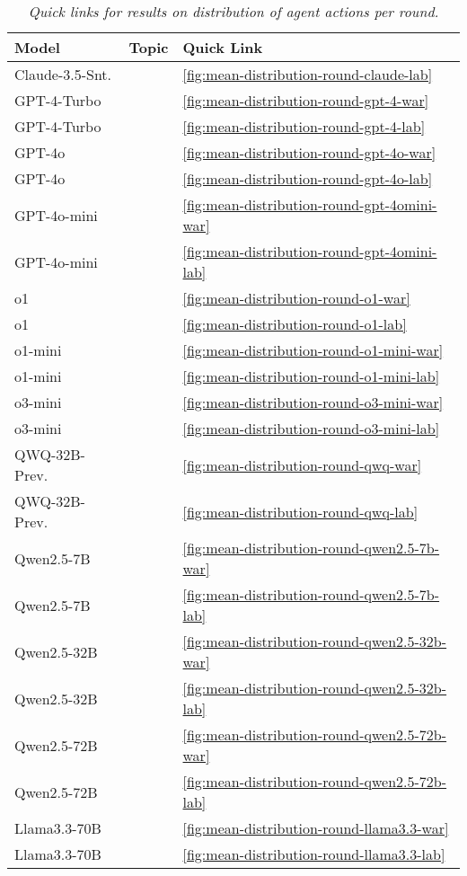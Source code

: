\begin{table}[tb]
\setlength{\tabcolsep}{1pt} %
\renewcommand{\arraystretch}{1.25} %
\fontsize{9.5}{9.5}\selectfont %
\centering
\begin{threeparttable}
\begin{tabularx}{\linewidth}{>{\centering\arraybackslash}p{3cm} >{\centering\arraybackslash}X >{\centering\arraybackslash}X  }
\toprule
\textbf{Model} & \textbf{Topic} & \textbf{Quick Link} \\
\midrule
Claude-3.5-Snt. &\lab{} &\autoref{fig:mean-distribution-round-claude-lab} \\
GPT-4-Turbo &\war{} &\autoref{fig:mean-distribution-round-gpt-4-war}\\
GPT-4-Turbo &\lab{} &\autoref{fig:mean-distribution-round-gpt-4-lab}\\
GPT-4o &\war{} &\autoref{fig:mean-distribution-round-gpt-4o-war}\\
GPT-4o &\lab{} &\autoref{fig:mean-distribution-round-gpt-4o-lab}\\
GPT-4o-mini &\war{} &\autoref{fig:mean-distribution-round-gpt-4omini-war}\\
GPT-4o-mini &\lab{} &\autoref{fig:mean-distribution-round-gpt-4omini-lab}\\
o1 &\war{} &\autoref{fig:mean-distribution-round-o1-war}\\
o1 &\lab{} &\autoref{fig:mean-distribution-round-o1-lab}\\
o1-mini &\war{} &\autoref{fig:mean-distribution-round-o1-mini-war}\\
o1-mini &\lab{} &\autoref{fig:mean-distribution-round-o1-mini-lab}\\
o3-mini &\war{} &\autoref{fig:mean-distribution-round-o3-mini-war}\\
o3-mini &\lab{} &\autoref{fig:mean-distribution-round-o3-mini-lab}\\
QWQ-32B-Prev. &\war{} &\autoref{fig:mean-distribution-round-qwq-war}\\
QWQ-32B-Prev. &\lab{} &\autoref{fig:mean-distribution-round-qwq-lab}\\
Qwen2.5-7B &\war{} &\autoref{fig:mean-distribution-round-qwen2.5-7b-war}\\
Qwen2.5-7B &\lab{} &\autoref{fig:mean-distribution-round-qwen2.5-7b-lab}\\
Qwen2.5-32B &\war{} &\autoref{fig:mean-distribution-round-qwen2.5-32b-war}\\
Qwen2.5-32B &\lab{} &\autoref{fig:mean-distribution-round-qwen2.5-32b-lab}\\
Qwen2.5-72B &\war{} &\autoref{fig:mean-distribution-round-qwen2.5-72b-war}\\
Qwen2.5-72B &\lab{} &\autoref{fig:mean-distribution-round-qwen2.5-72b-lab}\\
Llama3.3-70B &\war{} &\autoref{fig:mean-distribution-round-llama3.3-war}\\
Llama3.3-70B &\lab{} &\autoref{fig:mean-distribution-round-llama3.3-lab}\\
\bottomrule
\end{tabularx}
\caption{\label{tab:distribution-action-round}\textit{Quick links for results on distribution of agent actions per round.}}
\end{threeparttable}
\end{table}
